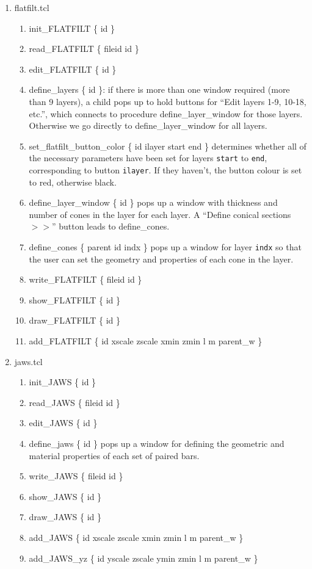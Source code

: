 \documentclass[12pt]{book}
\begin{document}
\begin{enumerate}
\item flatfilt.tcl
\begin{enumerate}
\item {\sf init\_FLATFILT \{ id \}}
\item {\sf read\_FLATFILT \{ fileid id \}}
\item {\sf edit\_FLATFILT \{ id \}}
\item {\sf define\_layers \{ id \}}: if there is more than one window
required (more than 9 layers), a child pops up to hold buttons for
``Edit layers 1-9, 10-18, etc.'', which connects to procedure
{\sf define\_layer\_window} for those layers.  Otherwise we go directly to
{\sf define\_layer\_window} for all layers.
\item {\sf set\_flatfilt\_button\_color \{ id ilayer start end \}} determines
whether all of the necessary parameters have been set for layers {\tt start}
to {\tt end}, corresponding to button {\tt ilayer}.  If they haven't, the button
colour is set to red, otherwise black.
\item {\sf define\_layer\_window \{ id \}} pops up a window with thickness and
number of cones in the layer for each layer.  A ``Define conical sections $>>$''
button leads to {\sf define\_cones}.
\item {\sf define\_cones \{ parent id indx \}} pops up a window for layer
{\tt indx} so that the user can set the geometry and properties of each cone
in the layer.
\item {\sf write\_FLATFILT \{ fileid id \}}
\item {\sf show\_FLATFILT \{ id \}}
\item {\sf draw\_FLATFILT \{ id \}}
\item {\sf add\_FLATFILT \{ id xscale zscale xmin zmin l m parent\_w \}}
\end{enumerate}

\item jaws.tcl
\begin{enumerate}
\item {\sf init\_JAWS \{ id \}}
\item {\sf read\_JAWS \{ fileid id \}}
\item {\sf edit\_JAWS \{ id \}}
\item {\sf define\_jaws \{ id \}} pops up a window for defining the
geometric and material properties of each set of paired bars.
\item {\sf write\_JAWS \{ fileid id \}}
\item {\sf show\_JAWS \{ id \}}
\item {\sf draw\_JAWS \{ id \}}
\item {\sf add\_JAWS \{ id xscale zscale xmin zmin l m parent\_w \}}
\item {\sf add\_JAWS\_yz \{ id yscale zscale ymin zmin l m parent\_w \}}
\end{enumerate}


\end{enumerate}
\end{document}
